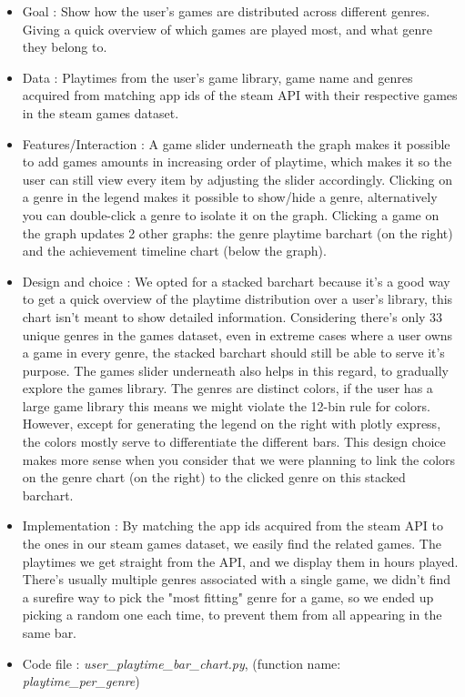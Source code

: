 \documentclass{article}
\begin{document}
        \begin{itemize}
           \item Goal : Show how the user's games are distributed across different genres. Giving a quick overview of which games are played most, and what genre they belong to.
           \item Data : Playtimes from the user's game library, game name and genres acquired from matching app ids of the steam API with their respective games in the steam games dataset.
           \item Features/Interaction : A game slider underneath the graph makes it possible to add games amounts in increasing order of playtime, which makes it so the user can still view every item by adjusting the slider accordingly. Clicking on a genre in the legend makes it possible to show/hide a genre, alternatively you can double-click a genre to isolate it on the graph. Clicking a game on the graph updates 2 other graphs: the genre playtime barchart (on the right) and the achievement timeline chart (below the graph).
           \item Design and choice : We opted for a stacked barchart because it's a good way to get a quick overview of the playtime distribution over a user's library, this chart isn't meant to show detailed information. Considering there's only 33 unique genres in the games dataset, even in extreme cases where a user owns a game in every genre, the stacked barchart should still be able to serve it's purpose. The games slider underneath also helps in this regard, to gradually explore the games library. The genres are distinct colors, if the user has a large game library this means we might violate the 12-bin rule for colors. However, except for generating the legend on the right with plotly express, the colors mostly serve to differentiate the different bars. This design choice makes more sense when you consider that we were planning to link the colors on the genre chart (on the right) to the clicked genre on this stacked barchart. 
           \item Implementation : By matching the app ids acquired from the steam API to the ones in our steam games dataset, we easily find the related games. The playtimes we get straight from the API, and we display them in hours played. There's usually multiple genres associated with a single game, we didn't find a surefire way to pick the "most fitting" genre for a game, so we ended up picking a random one each time, to prevent them from all appearing in the same bar. 
           \item Code file : \textit{user\_playtime\_bar\_chart.py}, (function name: \textit{playtime\_per\_genre})
        \end{itemize}
        
\end{document}
